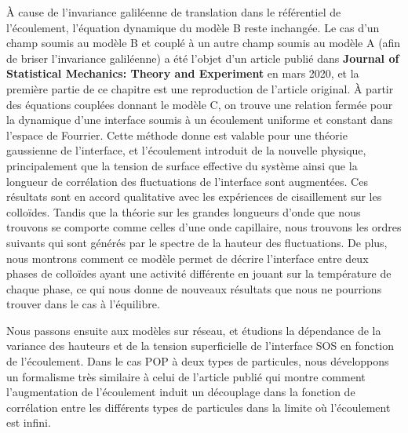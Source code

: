 À cause de l'invariance galiléenne de translation dans le référentiel de l'écoulement, l'équation dynamique du modèle B reste inchangée. Le cas d'un champ soumis au modèle B et couplé à un autre champ soumis au modèle A (afin de briser l'invariance galiléenne) a été l'objet d'un article publié dans {\bf Journal of Statistical Mechanics: Theory and Experiment} en mars 2020, et la première partie de ce chapitre est une reproduction de l'article original. À partir des équations couplées donnant le modèle C, on trouve une relation fermée pour la dynamique d'une interface soumis à un écoulement uniforme et constant dans l'espace de Fourrier. Cette méthode donne est valable pour une théorie gaussienne de l'interface, et l'écoulement introduit de la nouvelle physique, principalement que la tension de surface effective du système ainsi que la longueur de corrélation des fluctuations de l'interface sont augmentées. Ces résultats sont en accord qualitative avec les expériences de cisaillement sur les colloïdes. Tandis que la théorie sur les grandes longueurs d'onde que nous trouvons se comporte comme celles d'une onde capillaire, nous trouvons les ordres suivants qui sont générés par le spectre de la hauteur des fluctuations. De plus, nous montrons comment ce modèle permet de décrire l'interface entre deux phases de colloïdes ayant une activité différente en jouant sur la température de chaque phase, ce qui nous donne de nouveaux résultats que nous ne pourrions trouver dans le cas à l'équilibre.

Nous passons ensuite aux modèles sur réseau, et étudions la dépendance de la variance des hauteurs et de la tension superficielle de l'interface SOS en fonction de l'écoulement. Dans le cas POP à deux types de particules, nous développons un formalisme très similaire à celui de l'article publié qui montre comment l'augmentation de l'écoulement induit un découplage dans la fonction de corrélation entre les différents types de particules dans la limite où l'écoulement est infini.